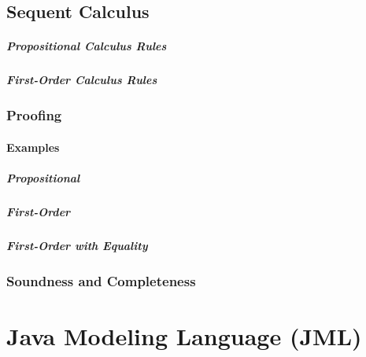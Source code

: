 \documentclass[a4paper, 11pt, accentcolor = tud3b]{tudreport}
\begin{document}
		\section{Sequent Calculus} %

			\paragraph{Propositional Calculus Rules} %

			\paragraph{First-Order Calculus Rules} %

			\subsection{Proofing} %

				\subsubsection{Examples} %

					\paragraph{Propositional} %

					\paragraph{First-Order} %

					\paragraph{First-Order with Equality} %

			\subsection{Soundness and Completeness} %

	\chapter{Java Modeling Language (JML)} %
\end{document}
